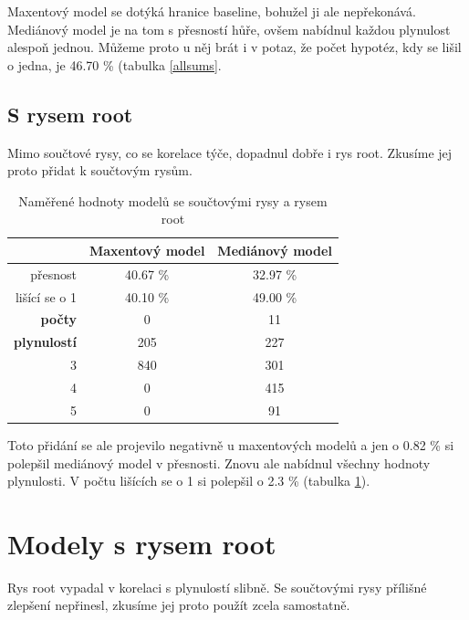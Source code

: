 \documentclass[12pt,a4paper]{report}
\begin{document}
Maxentový model se dotýká hranice baseline, bohužel ji ale nepřekonává. Mediánový model je na tom s přesností hůře, ovšem nabídnul každou plynulost alespoň jednou. Můžeme proto u něj brát i v potaz, že počet hypotéz, kdy se lišil o jedna, je 46.70 \% (tabulka \ref{allsums}.

\subsection{S rysem root}
Mimo součtové rysy, co se korelace týče, dopadnul dobře i rys root. Zkusíme jej proto přidat k součtovým rysům.

\begin{table}[!htbp]
\begin{center}
\begin{tabular}{|r|c|c|}
\hline
 & \textbf{Maxentový model} & \textbf{Mediánový model} \\
 \hline
     přesnost & 40.67 \%  & 32.97 \%  \\
\hline
lišící se o 1 & 40.10 \% & 49.00 \%  \\
\hline
     \textbf{počty} \quad 1 & \color{red}0   & \color{OliveGreen}11   \\
\textbf{plynulostí} \quad 2 & 205 & \color{OliveGreen}227   \\
                          3 & 840 & \color{OliveGreen}301 \\
                          4 & \color{red}0   & \color{OliveGreen}415 \\
                          5 & \color{red}0   & \color{OliveGreen}91  \\
\hline
\end{tabular}
\caption{Naměřené hodnoty modelů se součtovými rysy a rysem root}\label{tb:allsumsroot}
\end{center}
\end{table}

Toto přidání se ale projevilo negativně u maxentových modelů a jen o 0.82 \% si polepšil mediánový model v přesnosti. Znovu ale nabídnul všechny hodnoty plynulosti. V počtu lišících se o 1 si polepšil o 2.3 \% (tabulka \ref{tb:allsumsroot}).


\section{Modely s rysem root}
Rys root vypadal v korelaci s plynulostí slibně. Se součtovými rysy přílišné zlepšení nepřinesl, zkusíme jej proto použít zcela samostatně.
\end{document}
